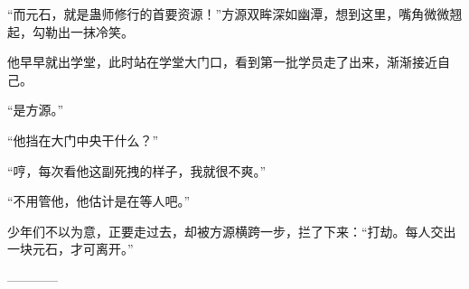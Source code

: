 \begin{this_body}
“而元石，就是蛊师修行的首要资源！”方源双眸深如幽潭，想到这里，嘴角微微翘起，勾勒出一抹冷笑。

他早早就出学堂，此时站在学堂大门口，看到第一批学员走了出来，渐渐接近自己。

“是方源。”

“他挡在大门中央干什么？”

“哼，每次看他这副死拽的样子，我就很不爽。”

“不用管他，他估计是在等人吧。”

少年们不以为意，正要走过去，却被方源横跨一步，拦了下来：“打劫。每人交出一块元石，才可离开。”

------------

\end{this_body}

